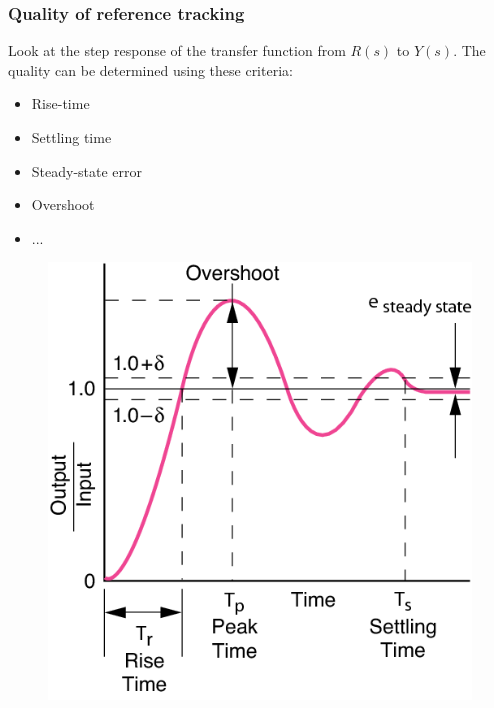 \begin{frame}
	\frametitle{Quality of reference tracking}
	\begin{minipage}{0.5\linewidth}
		\begin{block}{}
			Look at the step response of the transfer function from $R(s)$ to $Y(s)$. The quality can be determined using these criteria:
			\begin{itemize}
				\item Rise-time
				\item Settling time
				\item Steady-state error
				\item Overshoot
				\item ...
			\end{itemize}
		\end{block}
	\end{minipage}
	\hfill
	\begin{minipage}{0.4\linewidth}
		\begin{figure}
			\centering
			\includegraphics[width=1\linewidth]{properties}
			\label{fig:properties}
		\end{figure}
	\end{minipage}
\end{frame}

